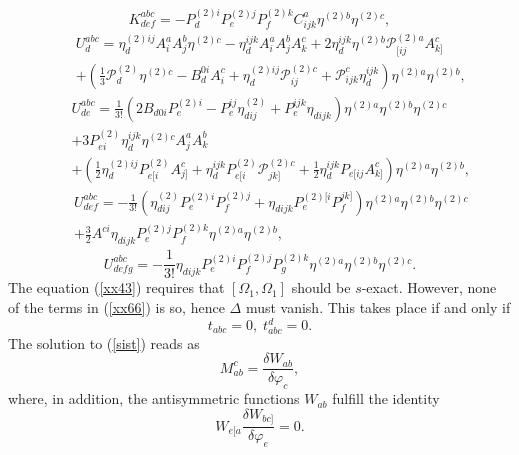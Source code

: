 \documentclass[a4paper,12pt]{article}
\begin{document}
\begin{equation}
K_{def}^{abc}=-P_{d}^{(2)i}P_{e}^{(2)j}P_{f}^{(2)k}C_{ijk}^{a}\eta
^{(2)b}\eta ^{(2)c},  \label{xx72}
\end{equation}
\begin{eqnarray}
&&U_{d}^{abc}=\eta _{d}^{(2)ij}A_{i}^{a}A_{j}^{b}\eta ^{(2)c}-\eta
_{d}^{ijk}A_{i}^{a}A_{j}^{b}A_{k}^{c}+2\eta _{d}^{ijk}\eta ^{(2)b}\mathcal{P}%
_{[ij}^{(2)a}A_{k]}^{c}  \nonumber \\
&&+\left( \frac{1}{3}\mathcal{P}_{d}^{(2)}\eta
^{(2)c}-B_{d}^{0i}A_{i}^{c}+\eta _{d}^{(2)ij}\mathcal{P}_{ij}^{(2)c}+%
\mathcal{P}_{ijk}^{c}\eta _{d}^{ijk}\right) \eta ^{(2)a}\eta ^{(2)b},
\label{xx73}
\end{eqnarray}
\begin{eqnarray}
&&U_{de}^{abc}= \frac{1}{3!}\left( 2B_{d0i}P_{e}^{(2)i}-P_{e}^{ij}\eta
_{dij}^{(2)}+P_{e}^{ijk}\eta _{dijk}\right) \eta ^{(2)a}\eta ^{(2)b}\eta
^{(2)c}  \nonumber \\
&&+3P_{ei}^{(2)}\eta _{d}^{ijk}\eta ^{(2)c}A_{j}^{a}A_{k}^{b}  \nonumber \\
&&+\left( \frac{1}{2}\eta _{d}^{(2)ij}P_{e[i}^{(2)}A_{j]}^{c}+\eta
_{d}^{ijk}P_{e[i}^{(2)}\mathcal{P}_{jk]}^{(2)c}+\frac{1}{2}\eta
_{d}^{ijk}P_{e[ij}A_{k]}^{c}\right) \eta ^{(2)a}\eta ^{(2)b},  \label{xx74}
\end{eqnarray}
\begin{eqnarray}
&&U_{def}^{abc}=-\frac{1}{3!}\left( \eta
_{dij}^{(2)}P_{e}^{(2)i}P_{f}^{(2)j}+\eta
_{dijk}P_{e}^{(2)[i}P_{f}^{jk]}\right) \eta ^{(2)a}\eta ^{(2)b}\eta ^{(2)c} 
\nonumber \\
&&+\frac{3}{2}A^{ci}\eta _{dijk}P_{e}^{(2)j}P_{f}^{(2)k}\eta ^{(2)a}\eta
^{(2)b},  \label{xx75}
\end{eqnarray}
\begin{equation}
U_{defg}^{abc}=-\frac{1}{3!}\eta
_{dijk}P_{e}^{(2)i}P_{f}^{(2)j}P_{g}^{(2)k}\eta ^{(2)a}\eta ^{(2)b}\eta
^{(2)c}.  \label{xx76}
\end{equation}
The equation (\ref{xx43}) requires that $[\Omega _{1},\Omega _{1}]$ should
be $s$-exact. However, none of the terms in (\ref{xx66}) is so, hence $%
\Delta $ must vanish. This takes place if and only if 
\begin{equation}
t_{abc}=0,\;t_{abc}^{d}=0.  \label{sist}
\end{equation}
The solution to (\ref{sist}) reads as 
\begin{equation}
M_{ab}^{c}=\frac{\delta W_{ab}}{\delta \varphi _{c}},  \label{sol}
\end{equation}
where, in addition, the antisymmetric functions $W_{ab}$ fulfill the
identity 
\begin{equation}
W_{e[a}\frac{\delta W_{bc]}}{\delta \varphi _{e}}=0.  \label{xx77}
\end{equation}
\end{document}
